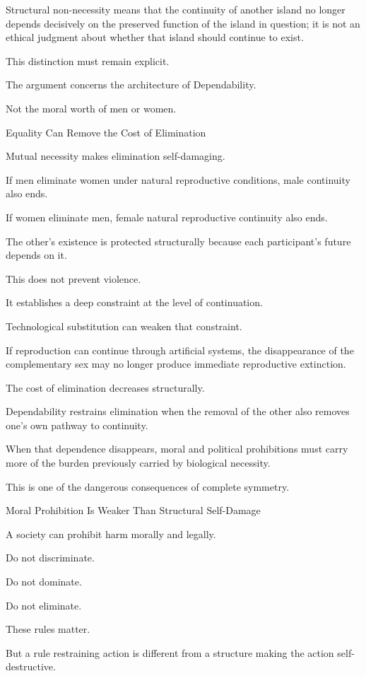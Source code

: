 Structural non-necessity means that the continuity of another island no longer depends decisively on the preserved function of the island in question; it is not an ethical judgment about whether that island should continue to exist.

This distinction must remain explicit.

The argument concerns the architecture of Dependability.

Not the moral worth of men or women.

Equality Can Remove the Cost of Elimination

Mutual necessity makes elimination self-damaging.

If men eliminate women under natural reproductive conditions, male continuity also ends.

If women eliminate men, female natural reproductive continuity also ends.

The other’s existence is protected structurally because each participant’s future depends on it.

This does not prevent violence.

It establishes a deep constraint at the level of continuation.

Technological substitution can weaken that constraint.

If reproduction can continue through artificial systems, the disappearance of the complementary sex may no longer produce immediate reproductive extinction.

The cost of elimination decreases structurally.

Dependability restrains elimination when the removal of the other also removes one’s own pathway to continuity.

When that dependence disappears, moral and political prohibitions must carry more of the burden previously carried by biological necessity.

This is one of the dangerous consequences of complete symmetry.

Moral Prohibition Is Weaker Than Structural Self-Damage

A society can prohibit harm morally and legally.

Do not discriminate.

Do not dominate.

Do not eliminate.

These rules matter.

But a rule restraining action is different from a structure making the action self-destructive.

